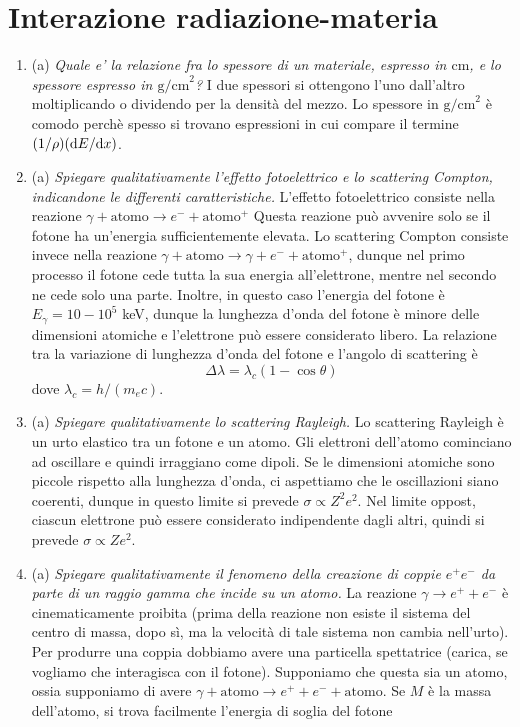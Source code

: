 \documentclass{article}
\renewcommand{\a}{(a)}
\renewcommand{\t}[1]{\textit{ #1}}
\begin{document}
\section{Interazione radiazione-materia}
\begin{enumerate}
	\item\a\t{Quale e' la relazione fra lo spessore di un materiale, espresso in $\mathrm{cm}$, e lo spessore
		espresso in $\mathrm{g/cm}^2$?} I due spessori si ottengono l'uno dall'altro moltiplicando o dividendo per la densità del mezzo. Lo spessore in $\mathrm{g/cm}^2$ è comodo perchè spesso si trovano espressioni in cui compare il termine $(1/\rho)(\mathrm{d} E/\mathrm{d} x)$.
	\item\a\t{Spiegare qualitativamente l’effetto fotoelettrico e lo scattering Compton,
		indicandone le differenti caratteristiche.} L'effetto fotoelettrico consiste nella reazione $\gamma+\textrm{atomo}\to e^-+\textrm{atomo}^+$ Questa reazione può avvenire solo se il fotone ha un'energia sufficientemente elevata.
	Lo scattering Compton consiste invece nella reazione $\gamma+\textrm{atomo}\to\gamma+e^-+\textrm{atomo}^+$, dunque nel primo processo il fotone cede tutta la sua energia all'elettrone, mentre nel secondo ne cede solo una parte. Inoltre, in questo caso l'energia del fotone è $E_\gamma=10-10^5$ keV, dunque la lunghezza d'onda del fotone è minore delle dimensioni atomiche e l'elettrone può essere considerato libero. La relazione tra la variazione di lunghezza d'onda del fotone e l'angolo di scattering è
	\[\Delta\lambda=\lambda_c(1-\cos\theta)\]
	dove $\lambda_c=h/(m_ec)$.
	\item\a\t{Spiegare qualitativamente lo scattering Rayleigh.}
	Lo scattering Rayleigh è un urto elastico tra un fotone e un atomo. Gli elettroni dell'atomo cominciano ad oscillare e quindi irraggiano come dipoli. Se le dimensioni atomiche sono piccole rispetto alla lunghezza d'onda, ci aspettiamo che le oscillazioni siano coerenti, dunque in questo limite si prevede $\sigma\propto Z^2e^2$. Nel limite oppost, ciascun elettrone può essere considerato indipendente dagli altri, quindi si prevede $\sigma\propto Ze^2$.
	\item\a\t{Spiegare qualitativamente il fenomeno della creazione di coppie $e^+e^-$ da parte di
		un raggio gamma che incide su un atomo.} La reazione $\gamma\to e^++e^-$ è cinematicamente proibita (prima della reazione non esiste il sistema del centro di massa, dopo sì, ma la velocità di tale sistema non cambia nell'urto). Per produrre una coppia dobbiamo avere una particella spettatrice (carica, se vogliamo che interagisca con il fotone). Supponiamo che questa sia un atomo, ossia supponiamo di avere $\gamma+\textrm{atomo}\to e^++e^-+\textrm{atomo}$. Se $M$ è la massa dell'atomo, si trova facilmente l'energia di soglia del fotone

\end{enumerate}
\end{document}
